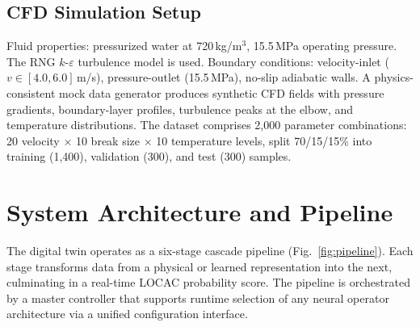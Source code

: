 \documentclass[conference]{IEEEtran}
\begin{document}
\subsection{CFD Simulation Setup}

Fluid properties: pressurized water at 720\,kg/m$^3$, 15.5\,MPa operating pressure. The RNG $k$-$\varepsilon$ turbulence model is used. Boundary conditions: velocity-inlet ($v \in [4.0, 6.0]$\,m/s), pressure-outlet (15.5\,MPa), no-slip adiabatic walls. A physics-consistent mock data generator produces synthetic CFD fields with pressure gradients, boundary-layer profiles, turbulence peaks at the elbow, and temperature distributions. The dataset comprises 2,000 parameter combinations: 20 velocity $\times$ 10 break size $\times$ 10 temperature levels, split 70/15/15\% into training (1,400), validation (300), and test (300) samples.

\section{System Architecture and Pipeline}
\label{sec:system}

The digital twin operates as a six-stage cascade pipeline (Fig.~\ref{fig:pipeline}). Each stage transforms data from a physical or learned representation into the next, culminating in a real-time LOCAC probability score. The pipeline is orchestrated by a master controller that supports runtime selection of any neural operator architecture via a unified configuration interface.
\end{document}
